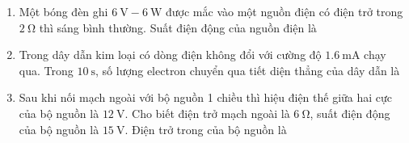 \begin{enumerate}[label=\bfseries Câu \arabic*:]
\item Một bóng đèn ghi $\SI{6}{\volt}-\SI{6}{\watt}$ được mắc vào một nguồn điện có điện trở trong $\SI{2}{\ohm}$ thì sáng bình thường. Suất điện động của nguồn điện là

\item Trong dây dẫn kim loại có dòng điện không đổi với cường độ $\SI{1.6}{\milli\ampere}$ chạy qua. Trong $\SI{10}{\second}$, số lượng electron chuyển qua tiết diện thẳng của dây dẫn là

\item Sau khi nối mạch ngoài với bộ nguồn 1 chiều thì hiệu điện thế giữa hai cực của bộ nguồn là $\SI{12}{\volt}$. Cho biết điện trở mạch ngoài là $\SI{6}{\ohm}$, suất điện động của bộ nguồn là $\SI{15}{\volt}$. Điện trở trong của bộ nguồn là


\end{enumerate}
